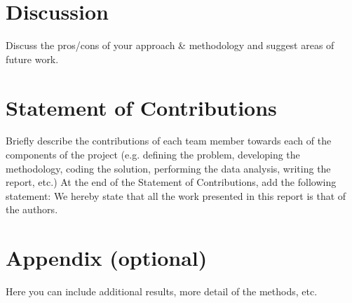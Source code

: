 \documentclass[conference]{IEEEtran}
\begin{document}
\section{Discussion} Discuss the pros/cons of your approach \& methodology
and suggest areas of future work.

\section{Statement of Contributions} Briefly describe the contributions of each
team member towards each of the components of the project (e.g.
defining the problem, developing the methodology, coding the solution,
performing the data analysis, writing the report, etc.) At the end
of the Statement of Contributions, add the following statement: We
hereby state that all the work presented in this report is that of the
authors.
\section{Appendix (optional)} 
Here you can include additional results, more
detail of the methods, etc.



\end{document}
